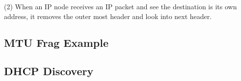 (2) When an IP node receives an IP packet and see the destination is its
own address, it removes the outer most header and look into next header.
\subsection{MTU Frag Example}
\begin{center}
\end{center}
\subsection{DHCP Discovery}
\begin{center}
\end{center}
